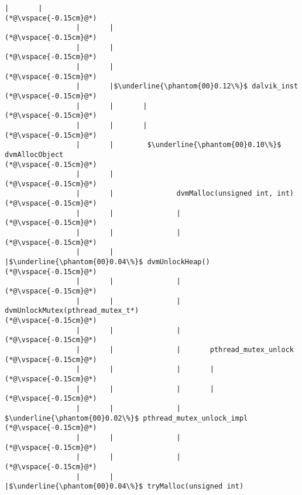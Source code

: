 \begin{lstlisting}[caption=NewDirectByteBuffer, label=profile:C2JNewDirectBuffer-512, numberbychapter=true, frame=lines, float, floatplacement=t]
                 |       |
(*@\vspace{-0.15cm}@*)
                 |       |
(*@\vspace{-0.15cm}@*)
                 |       |
(*@\vspace{-0.15cm}@*)
                 |       |
(*@\vspace{-0.15cm}@*)
                 |       |$\underline{\phantom{00}0.12\%}$ dalvik_inst
(*@\vspace{-0.15cm}@*)
                 |       |       |
(*@\vspace{-0.15cm}@*)
                 |       |       |
(*@\vspace{-0.15cm}@*)
                 |       |        $\underline{\phantom{00}0.10\%}$ dvmAllocObject
(*@\vspace{-0.15cm}@*)
                 |       |
(*@\vspace{-0.15cm}@*)
                 |       |               dvmMalloc(unsigned int, int)
(*@\vspace{-0.15cm}@*)
                 |       |               |
(*@\vspace{-0.15cm}@*)
                 |       |               |
(*@\vspace{-0.15cm}@*)
                 |       |               |$\underline{\phantom{00}0.04\%}$ dvmUnlockHeap()
(*@\vspace{-0.15cm}@*)
                 |       |               |
(*@\vspace{-0.15cm}@*)
                 |       |               |       dvmUnlockMutex(pthread_mutex_t*)
(*@\vspace{-0.15cm}@*)
                 |       |               |
(*@\vspace{-0.15cm}@*)
                 |       |               |       pthread_mutex_unlock
(*@\vspace{-0.15cm}@*)
                 |       |               |       |
(*@\vspace{-0.15cm}@*)
                 |       |               |       |
(*@\vspace{-0.15cm}@*)
                 |       |               |        $\underline{\phantom{00}0.02\%}$ pthread_mutex_unlock_impl
(*@\vspace{-0.15cm}@*)
                 |       |               |
(*@\vspace{-0.15cm}@*)
                 |       |               |
(*@\vspace{-0.15cm}@*)
                 |       |               |$\underline{\phantom{00}0.04\%}$ tryMalloc(unsigned int)

\end{lstlisting}
